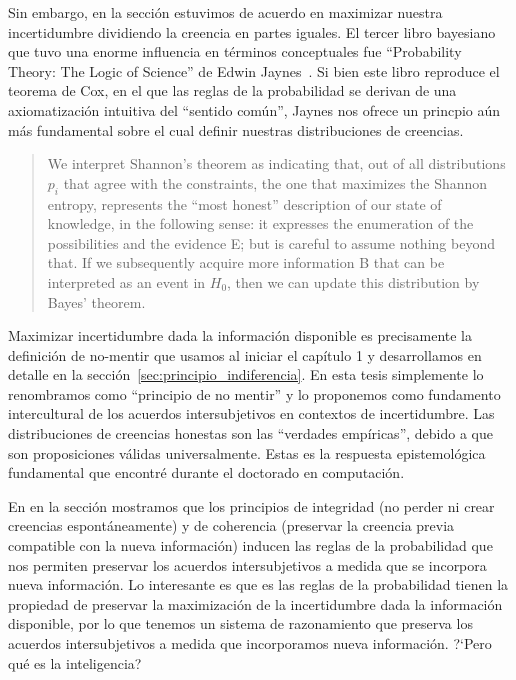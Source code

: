 \documentclass[a4paper,11pt]{book}
\theoremstyle{definition}
\begin{document}
Sin embargo, en la secci\'on \emph{} estuvimos de acuerdo en maximizar nuestra incertidumbre dividiendo la creencia en partes iguales.
%
El tercer libro bayesiano que tuvo una enorme influencia en t\'erminos conceptuales fue ``Probability Theory: The Logic of Science'' de Edwin Jaynes~\cite{Jaynes2003}.
%
Si bien este libro reproduce el teorema de Cox, en el que las reglas de la probabilidad se derivan de una axiomatizaci\'on intuitiva del ``sentido com\'un'', Jaynes nos ofrece un princpio a\'un m\'as fundamental sobre el cual definir nuestras distribuciones de creencias.
%
\begin{quotation}
We interpret Shannon's theorem as indicating that, out of all distributions $p_i$ that agree with the constraints, the one that maximizes the Shannon entropy, represents the ``most honest'' description of our state of knowledge, in the following sense: it expresses the enumeration of the possibilities and the evidence E; but is careful to assume nothing beyond that. If we subsequently acquire more information B that can be interpreted as an event in $H_0$, then we can update this distribution by Bayes' theorem. \cite{jaynes1984-bayesianBackground}
\end{quotation}
%
Maximizar incertidumbre dada la informaci\'on disponible es precisamente la definici\'on de no-mentir que usamos al iniciar el cap\'itulo 1 y desarrollamos en detalle en la secci\'on~\ref{sec:principio_indiferencia}.
%
En esta tesis simplemente lo renombramos como ``principio de no mentir'' y lo proponemos como fundamento intercultural de los acuerdos intersubjetivos en contextos de incertidumbre.
%
Las distribuciones de creencias honestas son las ``verdades emp\'iricas'', debido a que son proposiciones v\'alidas universalmente.
%
Estas es la respuesta epistemol\'ogica fundamental que encontr\'e durante el doctorado en computaci\'on.


En en la secci\'on \emph{} mostramos que los principios de integridad (no perder ni crear creencias espont\'aneamente) y de coherencia (preservar la creencia previa compatible con la nueva informaci\'on) inducen las reglas de la probabilidad que nos permiten preservar los acuerdos intersubjetivos a medida que se incorpora nueva informaci\'on.
%
Lo interesante es que es las reglas de la probabilidad tienen la propiedad de preservar la maximizaci\'on de la incertidumbre dada la informaci\'on disponible, por lo que tenemos un sistema de razonamiento que preserva los acuerdos intersubjetivos a medida que incorporamos nueva informaci\'on.
%
?`Pero qu\'e es la inteligencia?
\end{document}
